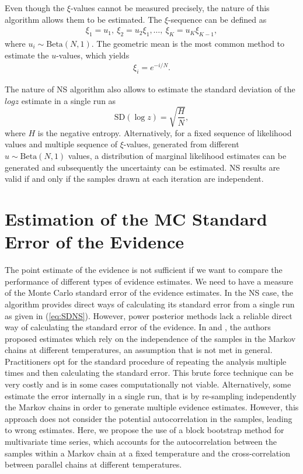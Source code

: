 \documentclass[aps,reprint,amsmath,amssymb,showpacs,showkeys]{revtex4-1}%
\begin{document}
Even though the $\xi$-values cannot be measured precisely, the nature of this algorithm allows them to be estimated. 
The $\xi$-sequence can be defined as 
\begin{align*}
\xi_1 = u_1,\: \xi_2 = u_2 \xi_1, \dots,\: \xi_K = u_K \xi_{K-1},
\end{align*}
where $u_i\sim\text{Beta}(N,1)$.  The geometric mean is the most common method to estimate the $u$-values, which yields
\begin{align*}
\xi_i = e^{-i/N}.
\end{align*}

The nature of NS algorithm also allows to estimate the standard deviation of the $log z$ estimate in a single run as 
\begin{equation}\label{eq:SDNS}
\text{SD}(\log z) = \sqrt{\dfrac{H}{N}},
\end{equation}
where $H$ is the negative entropy.  Alternatively, for a fixed sequence of likelihood values and multiple sequence of $\xi$-values, generated from different  $u\!\sim\!\text{Beta}(N,1)$ values, a distribution of marginal likelihood estimates can be generated and subsequently the uncertainty can be estimated.  NS results are valid if and only if the samples drawn at each iteration are independent.

\bigskip


\section{Estimation of the MC Standard Error of the Evidence}
The point estimate of the evidence  is not sufficient if we want to compare the  performance of different types of evidence estimates.   We
need  to have a measure of the Monte Carlo standard error of the evidence estimates.  In the NS case, the algorithm provides direct ways of calculating its standard error from  a single run as given in (\ref{eq:SDNS}).  However, power posterior methods lack a reliable direct way of calculating the standard error of the evidence.  In \cite{Lartillot:Philippe:2006} and \cite{Xie:Lewis:Fan:Kuo:Chen:2011}, the authors proposed estimates which rely on the  independence of the samples in the Markov chains at different temperatures, an assumption that is not met  in general.  Practitioners opt for the standard procedure of repeating the analysis multiple times and then calculating the standard error.  This brute force technique can be very costly and is in some cases computationally not viable.  Alternatively, some estimate the error internally in a single run, that is by re-sampling independently the Markov chains in order to generate multiple evidence estimates.  However, this approach does not consider the potential autocorrelation in the samples, leading to wrong estimates.  Here, we propose the use of a block bootstrap method for multivariate time series, which accounts for  the autocorrelation between the samples within a Markov chain at a fixed
temperature and the cross-correlation between parallel chains at different temperatures.
	
\end{document}
